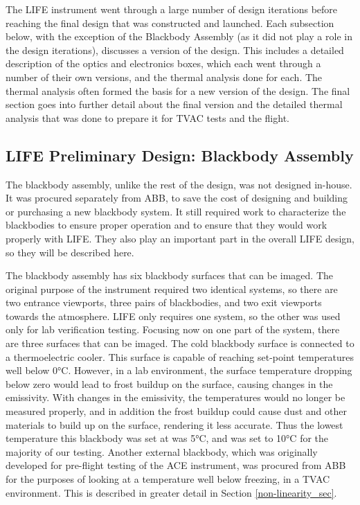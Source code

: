 The LIFE instrument went through a large number of design iterations before reaching the final design that was constructed and launched. Each subsection below, with the exception of the Blackbody Assembly (as it did not play a role in the design iterations), discusses a version of the design. This includes a detailed description of the optics and electronics boxes, which each went through a number of their own versions, and the thermal analysis done for each. The thermal analysis often formed the basis for a new version of the design. The final section goes into further detail about the final version and the detailed thermal analysis that was done to prepare it for TVAC tests and the flight.

\subsection{LIFE Preliminary Design: Blackbody Assembly}\label{blackbody_assem_sec}
The blackbody assembly, unlike the rest of the design, was not designed in-house. It was procured separately from ABB, to save the cost of designing and building or purchasing a new blackbody system. It still required work to characterize the blackbodies to ensure proper operation and to ensure that they would work properly with LIFE. They also play an important part in the overall LIFE design, so they will be described here.

The blackbody assembly has six blackbody surfaces that can be imaged. The original purpose of the instrument required two identical systems, so there are two entrance viewports, three pairs of blackbodies, and two exit viewports towards the atmosphere. LIFE only requires one system, so the other was used only for lab verification testing. Focusing now on one part of the system, there are three surfaces that can be imaged. The cold blackbody surface is connected to a thermoelectric cooler. This surface is capable of reaching set-point temperatures well below 0°C. However, in a lab environment, the surface temperature dropping below zero would lead to frost buildup on the surface, causing changes in the emissivity. With changes in the emissivity, the temperatures would no longer be measured properly, and in addition the frost buildup could cause dust and other materials to build up on the surface, rendering it less accurate. Thus the lowest temperature this blackbody was set at was 5°C, and was set to 10°C for the majority of our testing. Another external blackbody, which was originally developed for pre-flight testing of the ACE instrument, was procured from ABB for the purposes of looking at a temperature well below freezing, in a TVAC environment. This is described in greater detail in Section \ref{non-linearity_sec}. 


